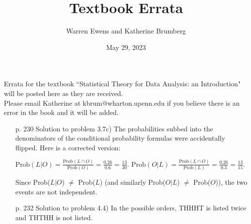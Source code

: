 \documentclass{article}
\title{Textbook Errata}
\author{Warren Ewens and Katherine Brumberg}
\date{May 29, 2023}
\begin{document}
\maketitle

\noindent Errata for the textbook ``Statistical Theory for Data Analysis: an Introduction" will be posted here as they are received. \\

\noindent Please email Katherine at kbrum@wharton.upenn.edu if you believe there is an error in the book and it will be added.


\begin{enumerate}
\item[p. 230]  Solution to problem 3.7c) The probabilities subbed into the denominators of the conditional probability formulas were accidentally flipped. Here is a corrected version:

$\text{Prob}(L | O) = \frac{\text{Prob}(L\cap O)}{\text{Prob}(O)} = \frac{0.26}{0.6} = \frac{13}{30}.$
$\text{Prob}(O | L) = \frac{\text{Prob}(L\cap O)}{\text{Prob}(L)} = \frac{0.26}{0.3} =  \frac{13}{15}.$\smallskip

Since Prob($L | O$) $\neq$ Prob($L$) (and similarly Prob($O | L$) $\neq$ Prob($O$)), the two events are not independent.

\item[p. 232] Solution to problem 4.4) In the possible orders, THHHT is listed twice and THTHH is not listed.

\end{enumerate}
\end{document}

